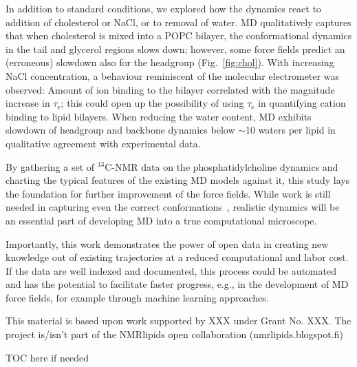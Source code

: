 \documentclass[journal=jpcbfk,manuscript=article,layout=twocolumn]{achemso}
\begin{document}

In addition to standard conditions, we explored how the dynamics react to addition of cholesterol or NaCl, or to removal of water.
%
MD qualitatively captures that when cholesterol is mixed into a POPC bilayer, the conformational dynamics in the tail and glycerol regions slows down; however, some force fields predict an (erroneous) slowdown also for the headgroup (Fig.~\ref{fig:chol}).
%
With increasing NaCl concentration, a behaviour reminiscent of the molecular electrometer was observed: Amount of ion binding to the bilayer correlated with the magnitude increase in $\tau_\mathrm e$; this could open up the possibility of using $\tau_\mathrm e$ in quantifying cation binding to lipid bilayers.
%
When reducing the water content, MD exhibits slowdown of headgroup and backbone dynamics below $\sim$10 waters per lipid in qualitative agreement with experimental data. 

By gathering a set of $^{13}$C-NMR data on the phosphatidylcholine dynamics and charting the typical features of the existing MD models against it, this study lays the foundation for further improvement of the force fields. While work is still needed in capturing even the correct conformations~\cite{botan15}, realistic dynamics will be an essential part of developing MD into a true computational microscope.

Importantly, this work demonstrates the power of open data in creating new knowledge out of existing trajectories at a reduced computational and labor cost. %
If the data are well indexed and documented, this process could be automated and has the potential to facilitate faster progress, e.g., in the development of MD force fields, for example through machine learning approaches.


\acknowledgement
  This material is based upon work supported by XXX under Grant No. XXX. The project is/isn't part of the NMRlipids open collaboration (nmrlipids.blogspot.fi)



\begin{tocentry}
 TOC here if needed
\end{tocentry}
\end{document}
